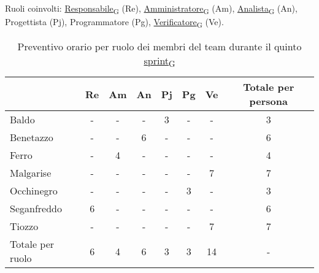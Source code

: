 Ruoli coinvolti: \href{https://7last.github.io/docs/rtb/documentazione-interna/glossario\#responsabile}{Responsabile\textsubscript{G}} (Re), \href{https://7last.github.io/docs/rtb/documentazione-interna/glossario\#amministratore}{Amministratore\textsubscript{G}} (Am), \href{https://7last.github.io/docs/rtb/documentazione-interna/glossario\#analista}{Analista\textsubscript{G}} (An), Progettista (Pj), Programmatore (Pg), \href{https://7last.github.io/docs/rtb/documentazione-interna/glossario\#verificatore}{Verificatore\textsubscript{G}} (Ve).
\begin{table}[!h]
    \centering
    \begin{tabular}{ | l | c | c | c | c | c | c | c | }
        \hline
        \textbf{} & \textbf{Re} & \textbf{Am} &\textbf{An} & \textbf{Pj} & \textbf{Pg} & \textbf{Ve} & \textbf{Totale per persona} \\
        \hline
        Baldo            &  -   &  -   &  -   &  3   &  -   &  -   &  3   \\
        Benetazzo        &  -   &  -   &  6   &  -   &  -   &  -   &  6   \\
        Ferro            &  -   &  4   &  -   &  -   &  -   &  -   &  4   \\
        Malgarise        &  -   &  -   &  -   &  -   &  -   &  7   &  7   \\
        Occhinegro       &  -   &  -   &  -   &  -   &  3   &  -   &  3   \\
        Seganfreddo      &  6   &  -   &  -   &  -   &  -   &  -   &  6   \\
        Tiozzo           &  -   &  -   &  -   &  -   &  -   &  7   &  7   \\
        \hline
        Totale per ruolo &  6   &  4   &  6   &  3   &  3   &  14  &  -   \\
        \hline
    \end{tabular}
    \caption{Preventivo orario per ruolo dei membri del team durante il quinto \href{https://7last.github.io/docs/rtb/documentazione-interna/glossario\#sprint}{sprint\textsubscript{G}}} 
\end{table}

